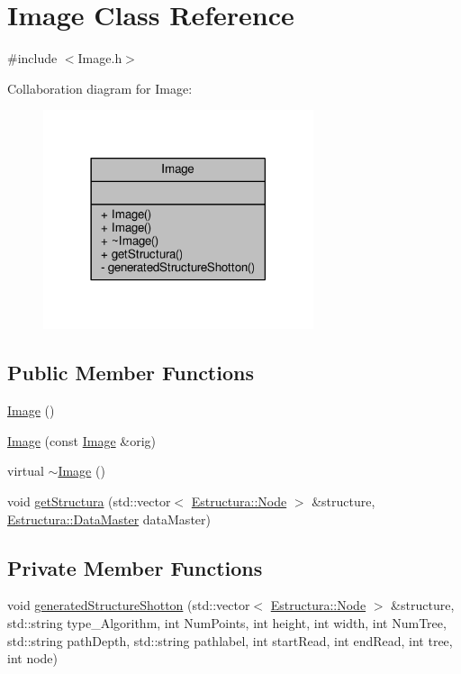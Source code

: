 \hypertarget{classImage}{}\section{Image Class Reference}
\label{classImage}


{\ttfamily \#include $<$Image.\+h$>$}



Collaboration diagram for Image\+:
\nopagebreak
\begin{figure}[H]
\begin{center}
\leavevmode
\includegraphics[width=225pt]{classImage__coll__graph}
\end{center}
\end{figure}
\subsection*{Public Member Functions}
\begin{DoxyCompactItemize}
\item 
\hyperlink{classImage_a58edd1c45b4faeb5f789b0d036d02313}{Image} ()
\item 
\hyperlink{classImage_abda271aa11b907dda8c8c8176684227d}{Image} (const \hyperlink{classImage}{Image} \&orig)
\item 
virtual \hyperlink{classImage_a0294f63700543e11c0f0da85601c7ae5}{$\sim$\+Image} ()
\item 
void \hyperlink{classImage_ad5ed787922c9c8aad26e1e349bdc4018}{get\+Structura} (std\+::vector$<$ \hyperlink{structEstructura_1_1Node}{Estructura\+::\+Node} $>$ \&structure, \hyperlink{structEstructura_1_1DataMaster}{Estructura\+::\+Data\+Master} data\+Master)
\end{DoxyCompactItemize}
\subsection*{Private Member Functions}
\begin{DoxyCompactItemize}
\item 
void \hyperlink{classImage_acc132bd92aec2c6186937566b593aafc}{generated\+Structure\+Shotton} (std\+::vector$<$ \hyperlink{structEstructura_1_1Node}{Estructura\+::\+Node} $>$ \&structure, std\+::string type\+\_\+\+Algorithm, int Num\+Points, int height, int width, int Num\+Tree, std\+::string path\+Depth, std\+::string pathlabel, int start\+Read, int end\+Read, int tree, int node)
\end{DoxyCompactItemize}


